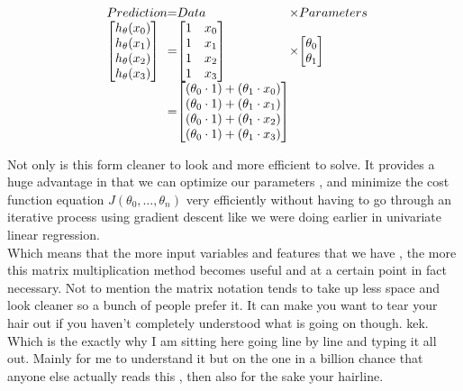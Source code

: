 \[
\begin{array}{ l@{} l@{} l@{} l@{} l@{} l@{}}
Prediction
& =
& Data
& \times
& Parameters \\
\begin{bmatrix}
	h_{\theta}(x_0) \\
	h_{\theta}(x_1) \\
	h_{\theta}(x_2) \\
	h_{\theta}(x_3) \\
\end{bmatrix}
& =
& \begin{bmatrix}
	1 & x_0 \\
	1 & x_1 \\
	1 & x_2 \\
	1 & x_3 \\
\end{bmatrix}
& \times
& \begin{bmatrix}
	\theta_0 \\
	\theta_1 \\
\end{bmatrix}
\\
& =
& \begin{bmatrix}
	( \theta_0 \cdot 1 ) + (\theta_1 \cdot x_0) \\
	( \theta_0 \cdot 1 ) + (\theta_1 \cdot x_1) \\
	( \theta_0 \cdot 1 ) + (\theta_1 \cdot x_2) \\
	( \theta_0 \cdot 1 ) + (\theta_1 \cdot x_3) \\
\end{bmatrix}
\\
\end{array}
\]

Not only is this form cleaner to look and more efficient to solve. It provides a
huge advantage in that we can optimize our parameters , and minimize the cost
function equation $ J(\theta_0 , \ldots , \theta_n) $ very efficiently without
having to go through an iterative process using gradient descent like we were
doing earlier in univariate linear regression.\\

Which means that the more input variables and features that we have , the more
this matrix multiplication method becomes useful and at a certain point in fact
necessary. Not to mention the matrix notation tends to take up less space and
look cleaner so a bunch of people prefer it. It can make you want to tear your
hair out if you haven't completely understood what is going on though. kek.
Which is the exactly why I am sitting here going line by line and typing it all
out.  Mainly for me to understand it but on the one in a billion chance that
anyone else actually reads this , then also for the sake your hairline.\\

